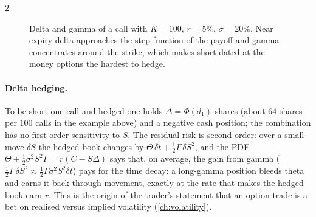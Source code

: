 \begin{paracol}{2}
\begin{figure}[ht]
\caption{Delta and gamma of a call with $K=100$, $r=5\%$, $\sigma=20\%$. Near expiry delta approaches the step function of the payoff and gamma concentrates around the strike, which makes short-dated at-the-money options the
hardest to hedge.}\label{ch15:fig-greeks}
\end{figure}

\paragraph{Delta hedging.} To be short one call and hedged one holds $\Delta=\Phi(d_1)$ shares (about $64$ shares per $100$ calls in the example above) and a negative cash position; the combination has
no first-order sensitivity to $S$. The residual risk is second order: over a small move $\delta S$ the hedged book changes by $\Theta\,\delta t+\tfrac12\Gamma\,\delta S^2$,
and the PDE $\Theta+\tfrac12\sigma^2S^2\Gamma=r(C-S\Delta)$ says that, on average, the gain from gamma ($\tfrac12\Gamma\,\delta S^2\approx\tfrac12\Gamma\sigma^2S^2\delta t$) pays for the time decay: a long-gamma
position bleeds theta and earns it back through movement, exactly at the rate that makes the hedged book earn $r$. This is the origin of the trader's statement that an option trade is a bet on realised versus implied volatility (\cref{ch:volatility}).


\end{paracol}
